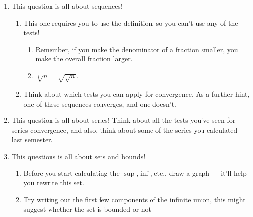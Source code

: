 \documentclass[
  12pt,
  a4paper]{extarticle}
\providecommand{\tightlist}{%
  \setlength{\itemsep}{0pt}\setlength{\parskip}{0pt}}
\theoremstyle{plain}
\theoremstyle{definition}
\theoremstyle{plain}
\theoremstyle{plain}
\theoremstyle{plain}
\theoremstyle{plain}
\theoremstyle{definition}
\theoremstyle{definition}
\theoremstyle{remark}
\theoremstyle{remark}
\renewcommand{\;}{\,}
\begin{document}
\begin{enumerate}
\def\labelenumi{\arabic{enumi})}
\tightlist
\item
  This question is all about sequences!

  \begin{enumerate}
  \def\labelenumii{\alph{enumii})}
  \tightlist
  \item
    This one requires you to use the definition, so you can't use any of the tests!

    \begin{enumerate}
    \def\labelenumiii{\roman{enumiii})}
    \tightlist
    \item
      Remember, if you make the denominator of a fraction smaller, you make the overall fraction larger.
    \item
      \(\sqrt[4]{n} = \sqrt{\sqrt{n}}\).
    \end{enumerate}
  \item
    Think about which tests you can apply for convergence. As a further hint, one of these sequences converges, and one doesn't.
  \end{enumerate}
\item
  This question is all about series! Think about all the tests you've seen for series convergence, and also, think about some of the series you calculated last semester.
\item
  This questions is all about sets and bounds!

  \begin{enumerate}
  \def\labelenumii{\alph{enumii})}
  \tightlist
  \item
    Before you start calculating the \(\sup\),\(\inf\), etc., draw a graph --- it'll help you rewrite this set.
  \item
    Try writing out the first few components of the infinite union, this might suggest whether the set is bounded or not.
  \end{enumerate}
\end{enumerate}
\end{document}
